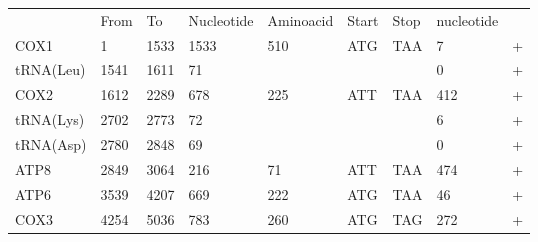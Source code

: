 \documentclass[../DISSERTACAO_MAIN.tex]{subfiles}
\begin{document}
\begin{longtable}{llllllllllllllllllllll}
			& From           & \multicolumn{2}{l}{To}    & \multicolumn{2}{l}{Nucleotide} & \multicolumn{3}{l}{Aminoacid}                 & \multicolumn{3}{l}{Start}         & \multicolumn{3}{l}{Stop}  & \multicolumn{3}{l}{nucleotide}  & \multicolumn{4}{l}{}                   \\
			COX1         & 1              & \multicolumn{2}{l}{1533}  & \multicolumn{2}{l}{1533}       & \multicolumn{3}{l}{510}                       & \multicolumn{3}{l}{ATG}           & \multicolumn{3}{l}{TAA}   & \multicolumn{3}{l}{7}           & \multicolumn{4}{l}{+}                  \\
			tRNA(Leu)    & 1541           & \multicolumn{2}{l}{1611}  & \multicolumn{2}{l}{71}         & \multicolumn{3}{l}{}                          & \multicolumn{3}{l}{}              & \multicolumn{3}{l}{}      & \multicolumn{3}{l}{0}           & \multicolumn{4}{l}{+}                  \\
			COX2         & 1612           & \multicolumn{2}{l}{2289}  & \multicolumn{2}{l}{678}        & \multicolumn{3}{l}{225}                       & \multicolumn{3}{l}{ATT}           & \multicolumn{3}{l}{TAA}   & \multicolumn{3}{l}{412}         & \multicolumn{4}{l}{+}                  \\
			tRNA(Lys)    & 2702           & \multicolumn{2}{l}{2773}  & \multicolumn{2}{l}{72}         & \multicolumn{3}{l}{}                          & \multicolumn{3}{l}{}              & \multicolumn{3}{l}{}      & \multicolumn{3}{l}{6}           & \multicolumn{4}{l}{+}                  \\
			tRNA(Asp)    & 2780           & \multicolumn{2}{l}{2848}  & \multicolumn{2}{l}{69}         & \multicolumn{3}{l}{}                          & \multicolumn{3}{l}{}              & \multicolumn{3}{l}{}      & \multicolumn{3}{l}{0}           & \multicolumn{4}{l}{+}                  \\
			ATP8         & 2849           & \multicolumn{2}{l}{3064}  & \multicolumn{2}{l}{216}        & \multicolumn{3}{l}{71}                        & \multicolumn{3}{l}{ATT}           & \multicolumn{3}{l}{TAA}   & \multicolumn{3}{l}{474}         & \multicolumn{4}{l}{+}                  \\
			ATP6         & 3539           & \multicolumn{2}{l}{4207}  & \multicolumn{2}{l}{669}        & \multicolumn{3}{l}{222}                       & \multicolumn{3}{l}{ATG}           & \multicolumn{3}{l}{TAA}   & \multicolumn{3}{l}{46}          & \multicolumn{4}{l}{+}                  \\
			COX3         & 4254           & \multicolumn{2}{l}{5036}  & \multicolumn{2}{l}{783}        & \multicolumn{3}{l}{260}                       & \multicolumn{3}{l}{ATG}           & \multicolumn{3}{l}{TAG}   & \multicolumn{3}{l}{272}         & \multicolumn{4}{l}{+}                  \\

\end{longtable}
\end{document}
